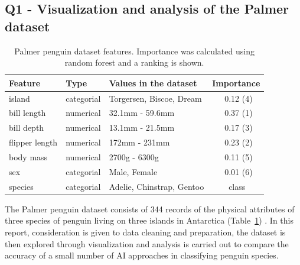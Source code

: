 \documentclass[12pt]{article}
\begin{document}
\begin{center}
\subsection*{Q1 - Visualization and analysis of the Palmer dataset}
\end{center}

\begin{table} %
  \small
  \begin{center}
  \vspace{-1.5\baselineskip} %
  \setlength{\abovecaptionskip}{5pt}
  \setlength{\belowcaptionskip}{5pt}
  \fontsize{10}{10}\selectfont %
  \begin{tabular}{l|l|l|l}
  \textbf{Feature}&\textbf{Type}&\textbf{Values in the dataset}&\textbf{Importance}\\
  \hline
  island&categorial&Torgersen, Biscoe, Dream&\ \ \ 0.12 (4)\\
  bill length&numerical&32.1mm - 59.6mm&\ \ \ 0.37 (1)\\
  bill depth&numerical&13.1mm - 21.5mm&\ \ \ 0.17 (3)\\
  flipper length&numerical&172mm - 231mm&\ \ \ 0.23 (2)\\
  body mass&numerical&2700g - 6300g&\ \ \ 0.11 (5)\\
  sex&categorial&Male, Female&\ \ \ 0.01 (6)\\
  species&categorial&Adelie, Chinstrap, Gentoo&\ \ \ \ class\\
  \end{tabular}
  \vspace{-2\baselineskip} %
  \end{center} 
  \caption{\centering\linespread{0.8}\selectfont Palmer penguin dataset features. Importance was calculated using random forest and a ranking is shown.}
  \vspace{-1\baselineskip} %
  \label{tab:dataset}
\end{table} 

\noindent
The Palmer penguin dataset consists of 344 records of the physical attributes of three species of penguin 
living on three islands in Antarctica (Table~\ref{tab:dataset}) \cite{PM}. 
In this report, consideration is given to data cleaning and preparation, 
the dataset is then explored through visualization and analysis is carried out 
to compare the accuracy of a small number of AI approaches in classifying penguin species. 
\end{document}
